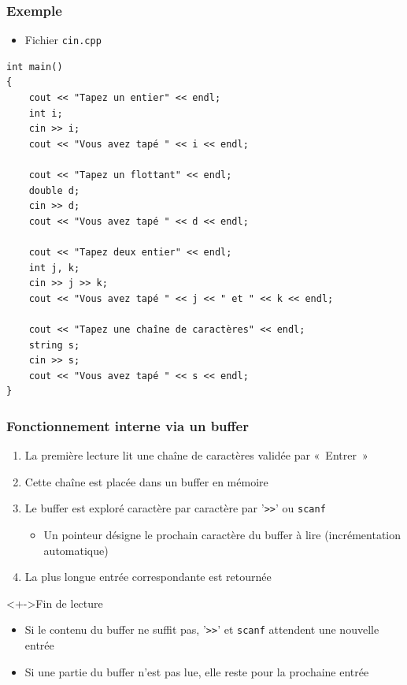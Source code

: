 \begin{frame}[containsverbatim]
\frametitle{Exemple}
\begin{itemize}
\item Fichier \texttt{cin.cpp}
\end{itemize}
\begin{lstlisting}
int main()
{
	cout << "Tapez un entier" << endl;
	int i;
	cin >> i;
	cout << "Vous avez tapé " << i << endl;

	cout << "Tapez un flottant" << endl;
	double d;
	cin >> d;
	cout << "Vous avez tapé " << d << endl;

	cout << "Tapez deux entier" << endl;
	int j, k;
	cin >> j >> k;
	cout << "Vous avez tapé " << j << " et " << k << endl;	

	cout << "Tapez une chaîne de caractères" << endl;
	string s;
	cin >> s;
	cout << "Vous avez tapé " << s << endl;	
}
\end{lstlisting}
\end{frame}

\begin{frame}
\frametitle{Fonctionnement interne via un buffer}
\begin{enumerate}[<+->]
\item La première lecture lit une chaîne de caractères validée par «~Entrer~»
\item Cette chaîne est placée dans un buffer en mémoire
\item Le buffer est exploré caractère par caractère par '\texttt{>>}' ou \texttt{scanf}
	\begin{itemize}
	\item Un pointeur désigne le prochain caractère du buffer à lire (incrémentation automatique)
	\end{itemize}
\item La plus longue entrée correspondante est retournée
\end{enumerate}
\begin{alertblock}<+->{Fin de lecture}
	\begin{itemize}[<+->]
	\item Si le contenu du buffer ne suffit pas, '\texttt{>>}' et \texttt{scanf} attendent une nouvelle entrée
	\item Si une partie du buffer n'est pas lue, elle reste pour la prochaine entrée
	\end{itemize}
\end{alertblock}
\end{frame}

